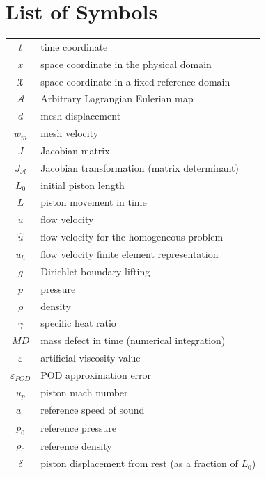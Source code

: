 \documentclass[thesis.tex]{subfiles}
\newcommand{\alemap}{\ensuremath{\mathcal{A}}}
\newcommand{\aleX}{\ensuremath{\mathcal{X}}}
\begin{document}
\section*{List of Symbols}

\begin{table}[h]        
    \begin{tabular}{cl}
        $t$ & time coordinate \\
        $x$ & space coordinate in the physical domain \\
        $\aleX$ & space coordinate in a fixed reference domain \\
        $\alemap$ & Arbitrary Lagrangian Eulerian map \\
        $d$ & mesh displacement \\
        $w_m$ & mesh velocity \\
        $J$ & Jacobian matrix \\
        $J_\alemap$ & Jacobian transformation (matrix determinant) \\
        $L_0$ & initial piston length \\
        $L$ & piston movement in time \\
        $u$ & flow velocity \\
        $\hat{u}$ & flow velocity for the homogeneous problem \\
        $u_h$ & flow velocity finite element representation \\ 
        $g$ & Dirichlet boundary lifting \\ 
        $p$ & pressure \\
        $\rho$ & density \\
        $\gamma$ & specific heat ratio \\
        $MD$ & mass defect in time (numerical integration) \\
        $\varepsilon$ & artificial viscosity value \\
        $\varepsilon_{POD}$ & POD approximation error \\
        $u_p$ & piston mach number \\
        $a_0$ & reference speed of sound \\
        $p_0$ & reference pressure \\
        $\rho_0$ & reference density \\
        $\delta$ & piston displacement from rest (as a fraction of $L_0$)\\

\end{tabular}
\end{table}
\end{document}
